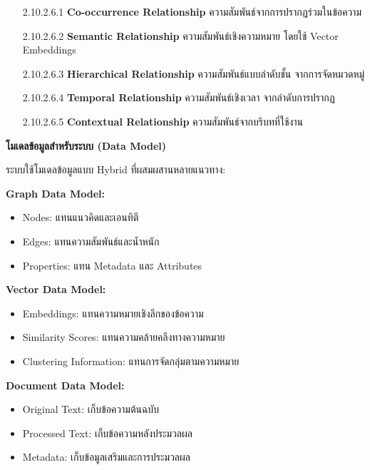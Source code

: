 \documentclass[12pt,a4paper]{article}
\begin{document}
\begin{enumerate}[leftmargin=2cm]
\begin{enumerate}
{\begin{enumerate}
            \begin{enumerate}
                \item[2.10.2.6.1] \textbf{Co-occurrence Relationship} ความสัมพันธ์จากการปรากฏร่วมในข้อความ
                \item[2.10.2.6.2] \textbf{Semantic Relationship} ความสัมพันธ์เชิงความหมาย โดยใช้ Vector Embeddings
                \item[2.10.2.6.3] \textbf{Hierarchical Relationship} ความสัมพันธ์แบบลำดับชั้น จากการจัดหมวดหมู่
                \item[2.10.2.6.4] \textbf{Temporal Relationship} ความสัมพันธ์เชิงเวลา จากลำดับการปรากฏ
                \item[2.10.2.6.5] \textbf{Contextual Relationship} ความสัมพันธ์จากบริบทที่ใช้งาน
            \end{enumerate}

            \vspace{0.3cm}

            \textbf{โมเดลข้อมูลสำหรับระบบ (Data Model)}

            \hspace{1cm}ระบบใช้โมเดลข้อมูลแบบ Hybrid ที่ผสมผสานหลายแนวทาง:

            \textbf{Graph Data Model:}
            \begin{itemize}
                \item Nodes: แทนแนวคิดและเอนทิตี
                \item Edges: แทนความสัมพันธ์และน้ำหนัก
                \item Properties: แทน Metadata และ Attributes
            \end{itemize}

            \textbf{Vector Data Model:}
            \begin{itemize}
                \item Embeddings: แทนความหมายเชิงลึกของข้อความ
                \item Similarity Scores: แทนความคล้ายคลึงทางความหมาย
                \item Clustering Information: แทนการจัดกลุ่มตามความหมาย
            \end{itemize}

            \textbf{Document Data Model:}
            \begin{itemize}
                \item Original Text: เก็บข้อความต้นฉบับ
                \item Processed Text: เก็บข้อความหลังประมวลผล
                \item Metadata: เก็บข้อมูลเสริมและการประมวลผล
            \end{itemize}


\end{enumerate}}
\end{enumerate}
\end{enumerate}
\end{document}
